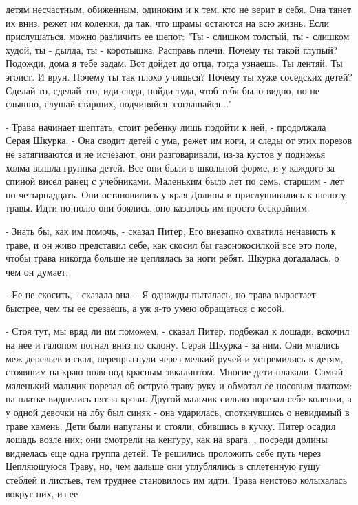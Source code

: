 детям несчастным, обиженным, одиноким и к тем, кто не верит в себя. 
Она тянет их вниз, режет им коленки, да так, что шрамы остаются на всю 
жизнь. Если прислушаться, можно различить ее шепот: "Ты - слишком 
толстый, ты - слишком худой, ты - дылда, ты - коротышка. Расправь 
плечи. Почему ты такой глупый? Подожди, дома я тебе задам. Вот дойдет 
до отца, тогда узнаешь. Ты лентяй. Ты эгоист. И врун. Почему ты так 
плохо учишься? Почему ты хуже соседских детей? Сделай то, сделай это, 
иди сюда, пойди туда, чтоб тебя было видно, но не слышно, слушай 
старших, подчиняйся, соглашайся..."
\par- Трава начинает шептать, стоит ребенку лишь подойти к ней, - 
продолжала Серая Шкурка. - Она сводит детей с ума, режет им ноги, и 
следы от этих порезов не затягиваются и не исчезают.
 они разговаривали, из-за кустов у подножья холма вышла 
группка детей. Все они были в школьной форме, и у каждого за спиной 
висел ранец с учебниками. Маленьким было лет по семь, старшим - лет по 
четырнадцать. Они остановились у края Долины и прислушивались к шепоту 
травы. Идти по полю они боялись, оно казалось им просто бескрайним.
\par- Знать бы, как им помочь, - сказал Питер, Его внезапно охватила 
ненависть к траве, и он живо представил себе, как скосил бы 
газонокосилкой все это поле, чтобы трава никогда больше не цеплялась 
за ноги ребят.
 Шкурка догадалась, о чем он думает,
\par- Ее не скосить, - сказала она. - Я однажды пыталась, но трава 
вырастает быстрее, чем ты ее срезаешь, а уж я-то умею обращаться с 
косой.
\par- Стоя тут, мы вряд ли им поможем, - сказал Питер.
 подбежал к лошади, вскочил на нее и галопом погнал вниз по 
склону. Серая Шкурка - за ним. Они мчались меж деревьев и скал, 
перепрыгнули через мелкий ручей и устремились к детям, стоявшим на 
краю поля под красным эвкалиптом. Многие дети плакали. Самый маленький 
мальчик порезал об острую траву руку и обмотал ее носовым платком: на 
платке виднелись пятна крови. Другой мальчик сильно порезал себе 
коленки, а у одной девочки на лбу был синяк - она ударилась, 
споткнувшись о невидимый в траве камень. Дети были напуганы и стояли, 
сбившись в кучку. Питер осадил лошадь возле них; они смотрели на 
кенгуру, как на врага.
, посреди долины виднелась еще одна группа детей. Те 
решились проложить себе путь через Цепляющуюся Траву, но, чем дальше 
они углублялись в сплетенную гущу стеблей и листьев, тем труднее 
становилось им идти. Трава неистово колыхалась вокруг них, из ее 
